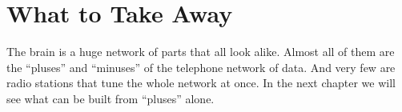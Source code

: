 \section*{What to Take Away}

The brain is a huge network of parts that all look alike. Almost all of them are the ``pluses'' and ``minuses'' of the telephone network of data. And very few are radio stations that tune the whole network at once. In the next chapter we will see what can be built from ``pluses'' alone.

